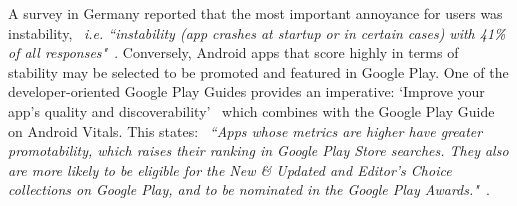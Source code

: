 A survey in Germany reported that the most important annoyance for users was instability, ~\emph{i.e. ``instability (app crashes at startup or in certain cases) with 41\% of all responses"}~\citep{nitze2015_a_survey_on_mobile_users_sq_perceptions_and_expectations}.  %
%
Conversely, Android apps that score highly in terms of stability may be selected to be promoted and featured in Google Play. One of the developer-oriented Google Play Guides provides an imperative: `Improve your app’s quality and discoverability'~\citep{android_store_listing_guide} which combines with the Google Play Guide on Android Vitals. This states: ~\emph{``Apps whose metrics are higher have greater promotability, which raises their ranking in Google Play Store searches. They also are more likely to be eligible for the New \& Updated and Editor's Choice collections on Google Play, and to be nominated in the Google Play Awards."}~\citep{android_android_vitals_guide}. %

